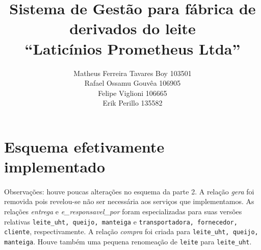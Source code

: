 \documentclass[11pt]{article}
\newcommand{\tit}[1]{\textit{#1}}
\newcommand{\ttt}[1]{\texttt{#1}}
\begin{document}
\title{Sistema de Gestão para fábrica de derivados do leite\\
	``Laticínios Prometheus Ltda''}
\author{
	Matheus Ferreira Tavares Boy 103501\\
	Rafael Ossamu Gouvêa 106905\\
	Felipe Viglioni 106665\\
	Erik Perillo 135582}
\date{}
\maketitle

\newpage

\section{Esquema efetivamente implementado}
\paragraph{}
Observações: houve poucas alterações no esquema da parte 2. 
A relação \tit{gera} foi removida pois 
revelou-se não ser necessária aos serviços que implementamos.
As relações \tit{entrega} e \tit{e\_responsavel\_por} foram especializadas
para suas versões relativas \ttt{leite\_uht, queijo, manteiga} e 
\ttt{transportadora, fornecedor, cliente}, respectivamente. 
A relação \tit{compra} foi criada para \ttt{leite\_uht, queijo, manteiga}.
Houve também uma pequena renomeação de \ttt{leite} para \ttt{leite\_uht}.
\end{document}
